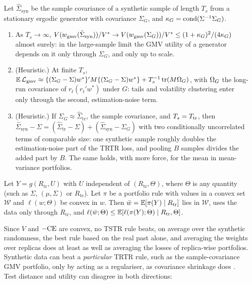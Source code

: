 \begin{corollary}\label{cor:gmv-drivers}
Let $\hat\Sigma_{\mathrm{syn}}$ be the sample covariance of a synthetic sample of length $T_s$ from
a stationary ergodic generator with covariance $\Sigma_G$, and $\kappa_G=\operatorname{cond}(\Sigma^{-1}\Sigma_G)$.
\begin{enumerate}
  \item[(i)] As $T_s\to\infty$,
  $V(w_{\mathrm{gmv}}(\hat\Sigma_{\mathrm{syn}}))/V^*\to V(w_{\mathrm{gmv}}(\Sigma_G))/V^*\le(1+\kappa_G)^2/(4\kappa_G)$
  almost surely: in the large-sample limit the GMV utility of a generator depends on it only
  through $\Sigma_G$, and only up to scale.
  \item[(ii)] (Heuristic.) At finite $T_s$,
  $\mathbb{E}\,\mathcal L_{\mathrm{gmv}}\approx\{(\Sigma_G-\Sigma)w^*\}'M\{(\Sigma_G-\Sigma)w^*\}+T_s^{-1}\operatorname{tr}(M\Omega_G)$,
  with $\Omega_G$ the long-run covariance of $r_t(r_t'w^*)$ under $G$: tails and volatility
  clustering enter only through the second, estimation-noise term.
  \item[(iii)] (Heuristic.) If $\Sigma_G\approx\hat\Sigma_{\mathrm{tr}}$, the \TRAIN{} sample
  covariance, and $T_s=T_{\mathrm{tr}}$, then
  $\hat\Sigma_{\mathrm{syn}}-\Sigma=(\hat\Sigma_{\mathrm{tr}}-\Sigma)+(\hat\Sigma_{\mathrm{syn}}-\Sigma_G)$
  with two conditionally uncorrelated terms of comparable size: one synthetic sample roughly
  doubles the estimation-noise part of the TRTR loss, and pooling $B$ samples divides the added
  part by $B$. The same holds, with more force, for the mean in mean-variance portfolios.
\end{enumerate}
\end{corollary}

\begin{proposition}\label{prop:no-free-lunch}
Let $Y=g(R_{\mathrm{tr}},U)$ with $U$ independent of $(R_{\mathrm{tr}},\Theta)$, where $\Theta$ is
any \TEST{} quantity (such as $\Sigma$, $(\mu,\Sigma)$ or $R_{\mathrm{te}}$). Let $\pi$ be a
portfolio rule with values in a convex set $\mathcal W$ and $\ell(w;\Theta)$ be convex in $w$.
Then $\bar w=\mathbb{E}[\pi(Y)\mid R_{\mathrm{tr}}]$ lies in $\mathcal W$, uses the data only through
$R_{\mathrm{tr}}$, and $\ell(\bar w;\Theta)\le\mathbb{E}[\ell(\pi(Y);\Theta)\mid R_{\mathrm{tr}},\Theta]$.
\end{proposition}

Since $V$ and $-\mathrm{CE}$ are convex, no TSTR rule beats, on average over the synthetic randomness,
the best rule based on the real past alone, and averaging the weights over replicas does at least
as well as averaging the losses of replica-wise portfolios. Synthetic data can beat a
\emph{particular} TRTR rule, such as the sample-covariance GMV portfolio, only by acting as a
regulariser, as covariance shrinkage does \citep{ledoit2004well,jagannathan2003risk}. Test
distance and utility can disagree in both directions:

